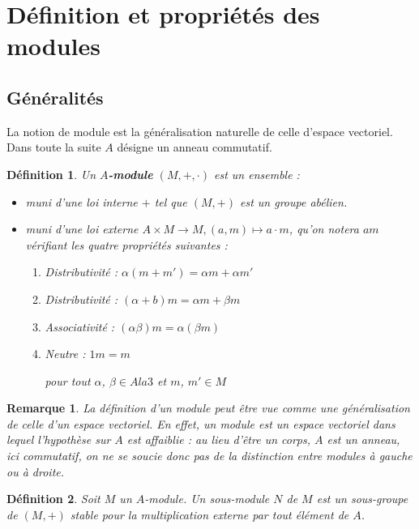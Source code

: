 \documentclass[a4paper,12pt]{report}  %
\theoremstyle{definitionstyle}
\newtheorem{definition}{Définition}[chapter] %
\theoremstyle{examplestyle}
\theoremstyle{remarkstyle}
\newtheorem{remark}{Remarque}[chapter] %
\theoremstyle{propositionstyle}
\begin{document}
	\section{Définition et propriétés des modules} %
	
	\subsection{Généralités}
	
	La notion de module est la généralisation naturelle de celle d'espace vectoriel. Dans toute la suite $A$ désigne un anneau commutatif.
	
	\begin{definition}
		Un \textbf{$A$-module} $(M, +, \cdot)$ est un ensemble :
		
		\begin{itemize}
			\item muni d'une loi interne $+$ tel que $(M, +)$ est un groupe abélien.
			\item muni d'une loi externe $A \times M \rightarrow M, (a, m) \mapsto a \cdot m$, qu'on notera $am$ vérifiant les quatre propriétés suivantes :
			\begin{enumerate}
				\item Distributivité : $\alpha(m + m') = \alpha m + \alpha m'$
				\item Distributivité : $(\alpha+b)m = \alpha m + \beta m$
				\item Associativité : $(\alpha \beta)m = \alpha(\beta m)$
				\item Neutre : $1m = m$
				
				pour tout $\alpha$, $\beta \in Ala 3$ et $m$, $m' \in M$
			\end{enumerate}
		\end{itemize}
	\end{definition}
	
	\begin{remark}
		La définition d'un module peut être vue comme une généralisation de celle d'un espace vectoriel. En effet, un module est un espace vectoriel dans lequel l'hypothèse sur $A$ est affaiblie : au lieu d'être un corps, $A$ est un anneau, ici commutatif, on ne se soucie donc pas de la distinction entre modules à gauche ou à droite.
	\end{remark}
	
	\begin{definition}
		Soit $M$ un $A$-module. Un sous-module $N$ de $M$ est un sous-groupe de $(M, +)$ stable pour la multiplication externe par tout élément de $A$.
	\end{definition}
	
\end{document}
